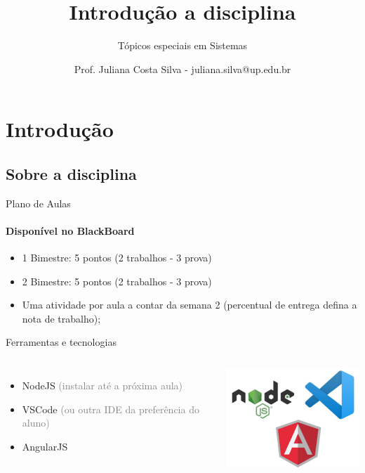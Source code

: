 \documentclass{beamer}
\title{Introdução a disciplina}
\subtitle{Tópicos especiais em Sistemas}
\author{Prof. Juliana Costa Silva - juliana.silva@up.edu.br}
\begin{document}
  \frame[c]{\maketitle}
    \section{Introdução}
    \subsection{Sobre a disciplina}
    \begin{frame}{Plano de Aulas}
      \framesubtitle{Disponível no BlackBoard}%
      
      \begin{itemize}
            \item 1 Bimestre: 5 pontos (2 trabalhos  -  3 prova)
            \item 2 Bimestre: 5 pontos (2 trabalhos - 3 prova)
            \item Uma atividade por aula a contar da semana 2 (percentual de entrega defina a nota de trabalho);
       \end{itemize}
     \end{frame}
    \begin{frame}[label=lists]{Ferramentas e tecnologias}
      \begin{columns}[onlytextwidth]
          \begin{itemize}
            \item NodeJS \textcolor{gray}{(instalar até a próxima aula)}
            \item VSCode \textcolor{gray}{(ou outra IDE da preferência do aluno)}
            \item AngularJS 
          \end{itemize}
            \includegraphics[width=55mm]{resources/aula1_4.png}
      \end{columns}
    \end{frame}
\end{document}
